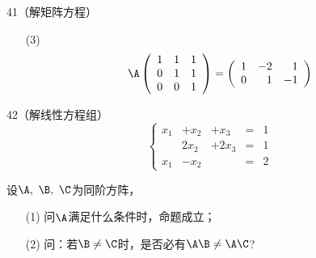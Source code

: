 \begin{frame}
  \begin{footnotesize}
    \begin{exampleblock}{41（解矩阵方程）}
      \begin{itemize}
      \item[(3)]
        $$
        \A\left(
        \begin{array}{rrr}
          1&1&1\\
          0&1&1\\
          0&0&1
        \end{array}
        \right)=
        \left(
        \begin{array}{rrr}
          1&-2&1\\
          0&1&-1
        \end{array}
        \right)        
        $$
      \end{itemize}
    \end{exampleblock}
  \end{footnotesize}
\end{frame}


\begin{frame}
  \begin{footnotesize}
    \begin{exampleblock}{42（解线性方程组）}     
      $$
      \left\{
      \begin{array}{rrrcr}
        x_1&+x_2&+x_3&=&1\\
           &2x_2&+2x_3&=&1\\
        x_1&-x_2&&=&2
      \end{array}
      \right.
      $$
    \end{exampleblock}
  \end{footnotesize}
\end{frame}



\begin{frame}
  \begin{footnotesize}
    \begin{exampleblock}{43}
      设$\A,~\B,~\C$为同阶方阵，
      \begin{itemize}
      \item[(1)]问$\A$满足什么条件时，命题\blue{$\A\B=\A\C~\Rightarrow~\B=\C$}成立；\\[0.05in]
      \item[(2)] 问：若$\B\ne\C$时，是否必有$\A\B\ne\A\C$?
      \end{itemize}
    \end{exampleblock}
  \end{footnotesize}
\end{frame}


